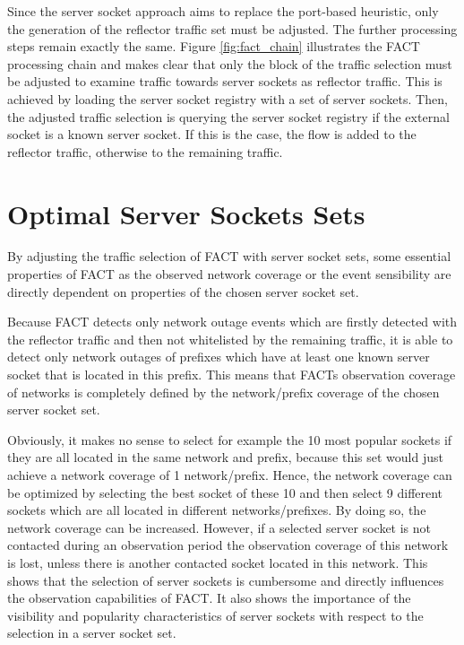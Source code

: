 Since the \gls{server socket} approach aims to replace the port-based heuristic, 
only the generation of the reflector traffic set must be adjusted. The further 
processing steps remain exactly the same. Figure \ref{fig:fact_chain} 
illustrates the \gls{FACT} processing chain and makes clear that only the block 
of the traffic selection must be adjusted to examine traffic towards 
\glspl{server socket} as reflector traffic. This is achieved by loading the 
\gls{server socket} registry with a set of \glspl{server socket}. Then, the 
adjusted traffic selection is querying the server socket registry if the 
external socket is a known \gls{server socket}. If this is the case, the flow is 
added to the reflector traffic, otherwise to the remaining traffic. 

\section{Optimal Server Sockets Sets\label{section:ses_selection}}
By adjusting the traffic selection of \gls{FACT} with \gls{server socket} sets, some essential properties of \gls{FACT} as the observed network coverage or the event sensibility are directly dependent on properties of the chosen 
\gls{server socket} set. 

Because \gls{FACT} detects only network outage events which are firstly detected with the reflector traffic and then not whitelisted by the remaining traffic, it is able to detect only network outages of prefixes which have at least one known 
server socket that is located in this prefix. This means that FACTs observation 
coverage of networks is completely defined by the network/prefix coverage of the 
chosen \gls{server socket} set. 

Obviously, it makes no sense to select for example the 10 most popular sockets 
if they are all located in the same network and prefix, because this set would 
just achieve a network coverage of 1 network/prefix. Hence, the network coverage 
can be optimized by selecting the best socket of these 10 and then select 9 
different sockets which are all located in different networks/prefixes. By doing 
so, the network coverage can be increased. However, if a selected 
\gls{server socket} is not contacted during an observation period the 
observation coverage of this network is lost, unless there is another contacted 
socket located in this network. 
This shows that the selection of \glspl{server socket} is cumbersome and 
directly influences the observation capabilities of FACT. It also shows the 
importance of the visibility and popularity characteristics of \glspl{server socket} 
with respect to the selection in a \gls{server socket} set. 

